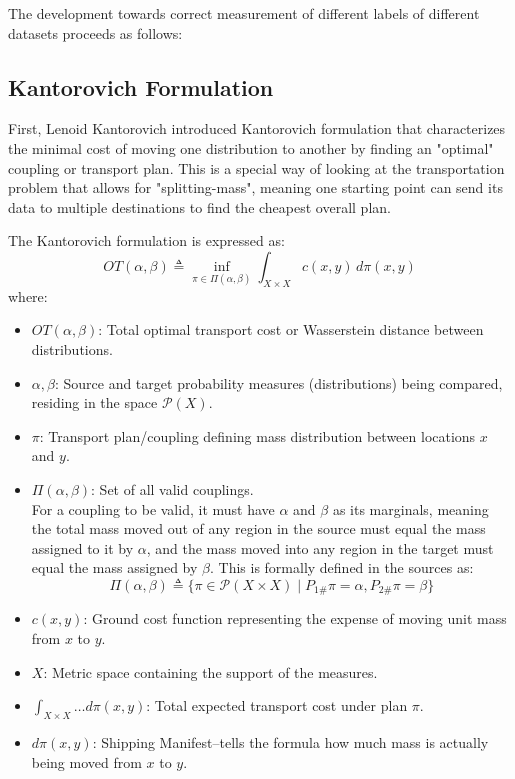 \documentclass[11pt, a4paper]{article}
\theoremstyle{plain} %
\theoremstyle{definition} %
\begin{document}
		The development towards correct measurement of different labels of different datasets proceeds as follows:
		\subsection{Kantorovich Formulation}
		\label{sec:kantorovich}
			First, Lenoid Kantorovich introduced Kantorovich formulation that characterizes the minimal cost of moving one distribution to another by finding an "optimal" coupling or transport plan. This is a special way of looking at the transportation problem that allows for "splitting-mass", meaning one starting point can send its data to multiple destinations to find the cheapest overall plan.

			The Kantorovich formulation is expressed as:
			\begin{equation}
				\label{eq:kantorovich_formulation}
				OT(\alpha, \beta) \triangleq \inf_{\pi \in \Pi(\alpha, \beta)} \int_{X \times X} c(x, y) \, d\pi(x, y)
			\end{equation}
			where:
			\begin{itemize}
				\item $OT(\alpha, \beta)$: Total optimal transport cost or Wasserstein distance between distributions.
				\item $\alpha, \beta$: Source and target probability measures (distributions) being compared, residing in the space $\mathcal{P}(X)$.
				\item $\pi$: Transport plan/coupling defining mass distribution between locations $x$ and $y$.
				\item $\Pi(\alpha, \beta)$: Set of all valid couplings.\\For a coupling to be valid, it must have $\alpha$ and $\beta$ as its marginals, meaning the total mass moved out of any region in the source must equal the mass assigned to it by $\alpha$, and the mass moved into any region in the target must equal the mass assigned by $\beta$. This is formally defined in the sources as:
				\begin{equation}
					\label{eq:coupling_set}
					\Pi(\alpha, \beta) \triangleq \{ \pi \in \mathcal{P}(X \times X) \mid P_{1\#}\pi = \alpha, P_{2\#}\pi = \beta \}
				\end{equation}
				\item $c(x, y)$: Ground cost function representing the expense of moving unit mass from $x$ to $y$.
				\item $X$: Metric space containing the support of the measures.
				\item $\int_{X \times X} \dots d\pi(x, y)$: Total expected transport cost under plan $\pi$.
				\item $d\pi$$(x, y)$: Shipping Manifest--tells the formula how much mass is actually being moved from $x$ to $y$.
			\end{itemize}
\end{document}
